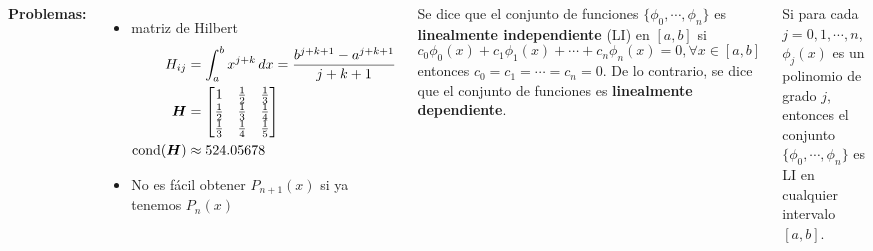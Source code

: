 \documentclass[9pt, aspectratio=169]{beamer}
\begin{document}
\begin{frame}
	\begin{columns}[t]
		\textbf{Problemas:}
		\begin{itemize}
			\item matriz de Hilbert
			      \begin{align*}
				      H_{ij}        & = \int_a^b x^{j+k} \, dx = \frac{b^{j+k+1} - a^{j+k+1}}{j + k + 1} \\
				      \bm{H}        & = \begin{bmatrix}
					                        1           & \frac{1}{2} & \frac{1}{3} \\
					                        \frac{1}{2} & \frac{1}{3} & \frac{1}{4} \\
					                        \frac{1}{3} & \frac{1}{4} & \frac{1}{5} \\
				                        \end{bmatrix}                          \\
				      \operatorname{cond}(\bm{H}) & \approx 524.05678
			      \end{align*} \pause
			\item No es fácil obtener $P_{n+1}(x)$ si ya tenemos $P_n(x)$
		\end{itemize} \pause

		\begin{definition}
			Se dice que el conjunto de funciones $\{ \phi_0, \cdots, \phi_n \}$ es \textbf{linealmente independiente} (LI) en $[a, b]$ si
			\[ c_0 \phi_0(x) + c_1 \phi_1(x) + \cdots + c_n \phi_n(x) = 0, \forall x \in [a, b] \]
			entonces $c_0 = c_1 = \cdots = c_n = 0$. De lo contrario, se dice que el conjunto de funciones es \textbf{linealmente dependiente}.
		\end{definition}  \pause

		\begin{theorem}[Polinomios LI]
			Si para cada $j = 0, 1, \cdots, n$, $\phi_j(x)$ es un polinomio de grado $j$, entonces el conjunto $\{ \phi_0, \cdots, \phi_n \}$ es LI en cualquier intervalo $[a, b]$.
		\end{theorem}

	\end{columns}
\end{frame}
\end{document}

